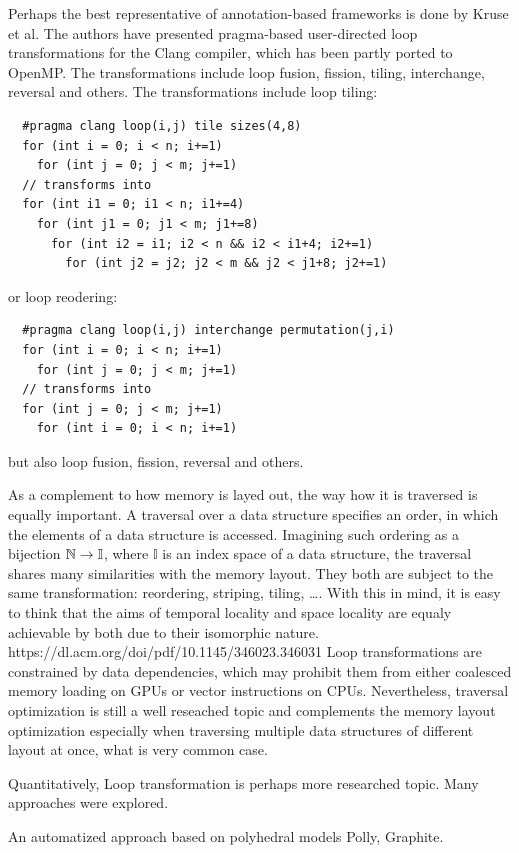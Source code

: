 Perhaps the best representative of annotation-based frameworks is done by Kruse et al. The authors have presented pragma-based user-directed loop transformations for the Clang compiler, which has been partly ported to OpenMP. The transformations include loop fusion, fission, tiling, interchange, reversal and others. The transformations include loop tiling:
\begin{verbatim}
  #pragma clang loop(i,j) tile sizes(4,8)
  for (int i = 0; i < n; i+=1)
    for (int j = 0; j < m; j+=1)
  // transforms into
  for (int i1 = 0; i1 < n; i1+=4)
    for (int j1 = 0; j1 < m; j1+=8)
      for (int i2 = i1; i2 < n && i2 < i1+4; i2+=1)
        for (int j2 = j2; j2 < m && j2 < j1+8; j2+=1)
\end{verbatim}
or loop reodering:
\begin{verbatim}
  #pragma clang loop(i,j) interchange permutation(j,i)
  for (int i = 0; i < n; i+=1)
    for (int j = 0; j < m; j+=1)
  // transforms into
  for (int j = 0; j < m; j+=1)
    for (int i = 0; i < n; i+=1)
\end{verbatim}
but also loop fusion, fission, reversal and others. 

As a complement to how memory is layed out, the way how it is traversed is equally important. A traversal over a data structure specifies an order, in which the elements of a data structure is accessed. Imagining such ordering as a bijection $\mathbb{N} \to \mathbb{I}$, where $\mathbb{I}$ is an index space of a data structure, the traversal shares many similarities with the memory layout. They both are subject to the same transformation: reordering, striping, tiling, \dots. With this in mind, it is easy to think that the aims of temporal locality and space locality are equaly achievable by both due to their isomorphic nature. https://dl.acm.org/doi/pdf/10.1145/346023.346031
Loop transformations are constrained by data dependencies, which may prohibit them from either coalesced memory loading on GPUs or vector instructions on CPUs. Nevertheless, traversal optimization is still a well reseached topic and complements the memory layout optimization especially when traversing multiple data structures of different layout at once, what is very common case.

Quantitatively, Loop transformation is perhaps more researched topic. Many approaches were explored. 

An automatized approach based on polyhedral models Polly, Graphite.

